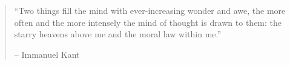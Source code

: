 \vspace*{\fill}
\begingroup
\begin{quote}
\centering
\em{``Two things fill the mind with ever-increasing wonder and awe,
the more often and the more intensely the mind of thought is drawn to
them: the starry heavens above me and the moral law within me.'' 

-- Immanuel Kant}
\end{quote}
\endgroup
\vspace*{\fill}

